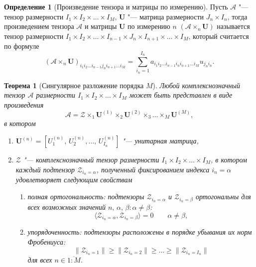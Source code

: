 \documentclass[specialist,
    substylefile = spbu_report.rtx,
    subf,href,colorlinks=true, 12pt]{disser}
\theoremstyle{plain}
\newtheorem{theorem}{Теорема}
\theoremstyle{definition}
\newtheorem{definition}{Определение}[section]
\theoremstyle{remark}
\begin{document}
    \begin{definition}[Произведение тензора и матрицы по измерению]
        Пусть $\mathcal A$ "--- тензор размерности $I_1\times I_2\times\ldots\times I_M$, $\mathbf U$
        "--- матрица размерности $J_n\times I_n$, тогда произведением тензора $\mathcal{A}$ и матрицы $\mathbf{U}$ по
        измерению $n$ $(\mathcal{A}\times_n \mathbf U)$ называется тензор размерности $I_1\times I_2\times\ldots\times I_{n-1}
        \times J_n\times I_{n+1}\times \ldots\times I_M$, который считается по формуле
        \[
            (\mathcal{A}\times_n \mathbf U)_{i_1 i_2\ldots i_{n-1}j_n i_{n+1}\ldots i_M} = \sum_{i_n=1}^{I_n} a_{i_1 i_2\ldots
            i_{n-1}i_n i_{n+1} \ldots i_M} u_{j_n i_n}.
        \]
    \end{definition}

    \begin{theorem}
        [Сингулярное разложение порядка $M$]
        Любой комплекснозначный тензор $\mathcal{A}$ размерности $I_1\times I_2 \times \ldots \times I_M$ может быть представлен
        в виде произведения
        \begin{equation}
            \mathcal{A} = \mathcal{Z} \times_1 \mathbf{U}^{(1)} \times_2 \mathbf{U}^{(2)} \times_3 \ldots \times_M \mathbf{U}^{(M)},\label{eq:hosvd}
        \end{equation}
        в котором
        \begin{enumerate}
            \item $\mathbf{U}^{(n)}=\left[U_1^{(n)},\, U_2^{(n)},\ldots,\, U_{I_n}^{(n)} \right]$ "--- унитарная матрица,
            \item $\mathcal{Z}$ "--- комплекснозначный тензор размерности $I_1\times I_2 \times \ldots \times I_M$, в котором
            каждый подтензор $\mathcal Z_{i_n=\alpha}$, полученный фиксированием индекса $i_n=\alpha$ удовлетворяет следующим свойствам
            \begin{enumerate}
                \item полная ортогональность: подтензоры $\mathcal Z_{i_n=\alpha}$ и $\mathcal Z_{i_n=\beta}$ ортогональны для всех возможных значений
                $n,\, \alpha,\, \beta: \alpha\ne\beta$:
                \[
                    \langle\mathcal Z_{i_n=\alpha},\mathcal Z_{i_n=\beta}\rangle=0 \qquad \alpha\ne\beta,
                \]
                \item упорядоченность: подтензоры расположены в порядке убывания их норм Фробениуса:
                \begin{equation}
                    \|\mathcal Z_{i_n=1}\|\geqslant\|\mathcal Z_{i_n=2}\| \geqslant \ldots \geqslant\|\mathcal Z_{i_n=I_n}\|\label{eq:order}
                \end{equation}
                для всех $n\in \overline{1:M}$.
            \end{enumerate}
        \end{enumerate}
    \end{theorem}
\end{document}
